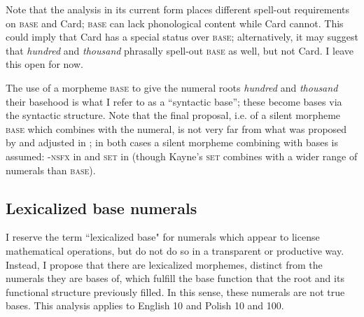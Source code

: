 \documentclass[output=paper]{langscibook}
\begin{document}
Note that the analysis in its current form places different spell-out requirements on \textsc{base} and Card; \textsc{base} can lack phonological content while Card cannot. This could imply that Card has a special status over \textsc{base}; alternatively, it may suggest that \textit{hundred} and \textit{thousand} phrasally spell-out \textsc{base} as well, but not Card. I leave this open for now.

The use of a morpheme \textsc{base} to give the numeral roots \textit{hundred} and \textit{thousand} their basehood is what I refer to as a ``syntactic base''; these become bases via the syntactic structure. Note that the final proposal, i.e. of a silent morpheme \textsc{base} which combines with the numeral, is not very far from what was proposed by \citet{kayne2005bases} and adjusted in \citet{kayne2019oneTwo}; in both cases a silent morpheme combining with bases is assumed: \textsc{-nsfx} in
 \citet{kayne2005bases} and \textsc{set} in \citet{kayne2019oneTwo} (though Kayne's \textsc{set} combines with a wider range of numerals than \textsc{base}).

\subsection{Lexicalized base numerals}\label{klo:lexicalizedBases}

I reserve the term ``lexicalized base" for numerals which appear to license mathematical operations, but do not do so in a transparent or productive way. Instead, I propose that there are lexicalized morphemes, distinct from the numerals they are bases of, which fulfill the base function that the root and its functional structure previously filled. In this sense, these numerals are not true bases. This analysis applies to English 10 and Polish 10 and 100. 
\end{document}
